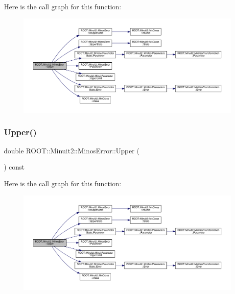 Here is the call graph for this function\+:
\nopagebreak
\begin{figure}[H]
\begin{center}
\leavevmode
\includegraphics[width=350pt]{d2/dd1/classROOT_1_1Minuit2_1_1MinosError_a0223fde13608aadee1f15b51d15b2bf6_cgraph}
\end{center}
\end{figure}
\mbox{\label{classROOT_1_1Minuit2_1_1MinosError_a0223fde13608aadee1f15b51d15b2bf6}} 
\subsubsection{\texorpdfstring{Upper()}{Upper()}\hspace{0.1cm}{\footnotesize\ttfamily [2/3]}}
{\footnotesize\ttfamily double R\+O\+O\+T\+::\+Minuit2\+::\+Minos\+Error\+::\+Upper (\begin{DoxyParamCaption}{ }\end{DoxyParamCaption}) const\hspace{0.3cm}{\ttfamily [inline]}}

Here is the call graph for this function\+:
\nopagebreak
\begin{figure}[H]
\begin{center}
\leavevmode
\includegraphics[width=350pt]{d2/dd1/classROOT_1_1Minuit2_1_1MinosError_a0223fde13608aadee1f15b51d15b2bf6_cgraph}
\end{center}
\end{figure}
\mbox{\label{classROOT_1_1Minuit2_1_1MinosError_a0223fde13608aadee1f15b51d15b2bf6}} 
